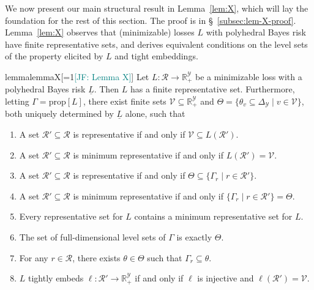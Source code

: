 \documentclass[11pt]{article}
\newcommand{\Comments}{1}
\newcommand{\mynote}[2]{\ifnum\Comments=1\textcolor{#1}{#2}\fi}
\newcommand{\raf}[1]{\mynote{darkgreen}{[RF: #1]}}
\newcommand{\jessie}[1]{\mynote{teal}{[JF: #1]}}
\newcommand{\reals}{\mathbb{R}}
\newcommand{\prop}[1]{\mathrm{prop}[#1]}
\newcommand{\simplex}{\Delta_\Y}
\newcommand{\R}{\mathcal{R}}
\newcommand{\V}{\mathcal{V}}
\newcommand{\Y}{\mathcal{Y}}
\newcommand{\risk}[1]{\underline{#1}}
\begin{document}
We now present our main structural result in Lemma~\ref{lem:X}, which will lay the foundation for the rest of this section.
The proof is in \S~\ref{subsec:lem-X-proof}.
Lemma~\ref{lem:X} observes that (minimizable) losses $L$ with polyhedral Bayes risk have finite representative sets, and derives equivalent conditions on the level sets of the property elicited by $L$ and tight embeddings.

\begin{restatable}{lemma}{lemmaX}[\jessie{Lemma X}]\label{lem:X}
  Let $L: \R \to \reals^\Y_+$ be a minimizable loss with a polyhedral Bayes risk $\risk L$.
  Then $L$ has a finite representative set.
  Furthermore, letting $\Gamma = \prop{L}$, there exist finite sets
  $\V \subseteq \reals^\Y_+$ and
  $\Theta = \{\theta_v \subseteq \simplex \mid v\in\V\}$,
  both uniquely determined by $\risk{L}$ alone,
  such that
  \begin{enumerate}
  \item A set $\R'\subseteq\R$ is representative if and only if $\V \subseteq L(\R')$.\label{item:X-rep-V}
  \item A set $\R'\subseteq\R$ is minimum representative if and only if $L(\R') = \V$.\label{item:X-min-V}
  \item A set $\R'\subseteq\R$ is representative if and only if $\Theta \subseteq \{\Gamma_r \mid r \in \R'\}$.\label{item:X-rep-Theta}
  \item A set $\R'\subseteq\R$ is minimum representative if and only if $\{\Gamma_r \mid r \in \R'\} = \Theta$.\label{item:X-min-Theta}
  \item Every representative set for $L$ contains a minimum representative set for $L$.\label{item:X-rep-contain-min}
  \item The set of full-dimensional level sets of $\Gamma$ is exactly $\Theta$.\label{item:X-full-dim}
  \item For any $r \in \R$, there exists $\theta \in \Theta$ such that $\Gamma_r \subseteq \theta$.\label{item:X-redundant}
  \item $L$ tightly embeds $\ell:\R'\to\reals^\Y_+$ if and only if $\ell$ is injective and $\ell(\R') = \V$.\label{item:X-tight-embed}
  \end{enumerate}
\end{restatable}
\end{document}
